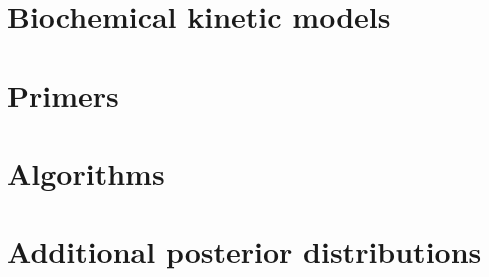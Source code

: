 \documentclass[]{phdthesis}
\begin{document}
\appendix
\chapter{Biochemical kinetic models}
\label{ap:ODEs}


\chapter{Primers}
\label{ap:Prim}


\chapter{Algorithms}
\label{ap:Alg}


\chapter{Additional posterior distributions}
\label{ap:figures}

\end{document}
